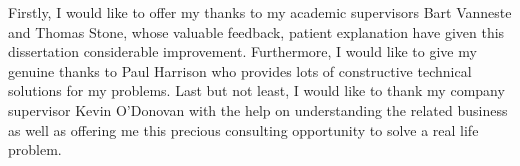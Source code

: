 Firstly, I would like to offer my thanks to my academic supervisors Bart Vanneste and Thomas Stone, whose valuable feedback, patient explanation have given this dissertation considerable improvement. Furthermore, I would like to give my genuine thanks to Paul Harrison who provides lots of constructive technical solutions for my problems. Last but not least, I would like to thank my company supervisor Kevin O'Donovan with the help on understanding the related business as well as offering me this precious consulting opportunity to solve a real life problem. 